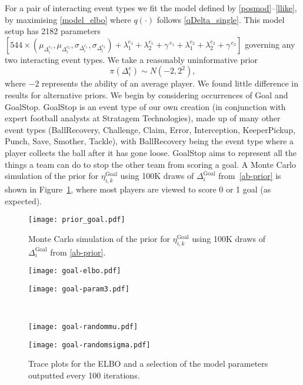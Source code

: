 \documentclass[11pt,a4paper]{article}
\begin{document}
For a pair of interacting event types we fit the model defined by 
\eqref{posmod}--\eqref{llike}, by maximising \eqref{model_elbo} where 
$q(\cdot)$ follows \eqref{qDelta_single}. This model setup has 2182 
parameters 
$[544\times(\mu_{\Delta_i^{e_1}},\mu_{\Delta_i^{e_2}},\sigma_{\Delta_i^{e_1}},\sigma_{\Delta_i^{e_2}}) + \lambda_1^{e_1} + \lambda_2^{e_1} + \gamma^{\,e_1} + \lambda_1^{e_2} +  \lambda_2^{e_2} + \gamma^{\,e_2}]$ 
governing any two interacting event types. We take a  
reasonably uninformative prior 
\begin{equation}\label{ab-prior}
\pi\left(\Delta_i^{e}\right)\sim N\left(-2,2^2\right),
\end{equation}
where $-2$ represents the ability of an average player. We found little 
difference in results for alternative priors. We begin by considering 
occurrences of Goal and GoalStop. GoalStop is an event type of our own 
creation (in conjunction with expert football analysts at Stratagem Technologies), made up of 
many other event types (BallRecovery, Challenge, Claim, Error, 
Interception, KeeperPickup, Punch, Save, Smother, Tackle), with 
BallRecovery being the event type where a player collects the ball 
after it has gone loose. GoalStop aims to represent all the things a 
team can do to stop the other team from scoring a goal. A Monte Carlo 
simulation of the prior for $\eta_{i,k}^{\textrm{Goal}}$ using 100K 
draws of $\Delta_i^{\textrm{Goal}}$ from~\eqref{ab-prior} is shown in 
Figure~\ref{priorgoal}, where most players are viewed to score 0 or 1 
goal (as expected). 



\begin{figure}%
      \centering
      \texttt{[image: prior\_goal.pdf]}
      \caption{Monte Carlo simulation of the prior for $\eta_{i,k}^{\textrm{Goal}}$ using 100K draws of $\Delta_i^{\textrm{Goal}}$ from \eqref{ab-prior}.} \label{priorgoal}
\end{figure} 



\begin{figure}[t]
\begin{minipage}[b]{0.48\linewidth}
        \centering
        \texttt{[image: goal-elbo.pdf]}
\end{minipage} 
\begin{minipage}[b]{0.48\linewidth}
        \centering
        \texttt{[image: goal-param3.pdf]}
\end{minipage} \\
\begin{minipage}[b]{0.48\linewidth}
        \centering
        \texttt{[image: goal-randommu.pdf]}
\end{minipage} 
\begin{minipage}[b]{0.48\linewidth}
        \centering
        \texttt{[image: goal-randomsigma.pdf]}
\end{minipage} 
      \caption{Trace plots for the ELBO and a selection of the model parameters outputted every 100 iterations.} \label{paramfig}
\end{figure} 
\end{document}
